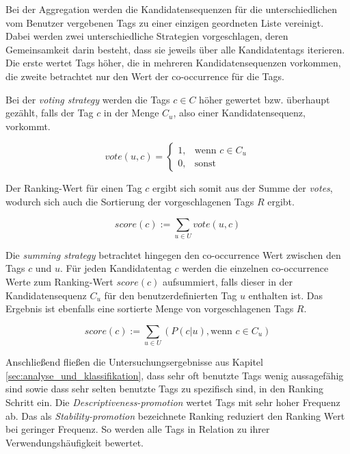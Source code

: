 Bei der Aggregation werden die Kandidatensequenzen für die unterschiedlichen vom Benutzer vergebenen Tags zu einer einzigen geordneten Liste vereinigt. Dabei werden zwei unterschiedliche Strategien vorgeschlagen, deren Gemeinsamkeit darin besteht, dass sie jeweils über alle Kandidatentags iterieren. Die erste wertet Tags höher, die in mehreren Kandidatensequenzen vorkommen, die zweite betrachtet nur den Wert der co-occurrence für die Tags. 

Bei der \emph{voting strategy} werden die Tags $c \in C$ höher gewertet bzw. überhaupt gezählt, falls der Tag $c$ in der Menge $C_u$, also einer Kandidatensequenz, vorkommt. 
\begin{figure}[hptb]
 \begin{equation}
 \label{voteAggregation}
  vote(u, c)=\begin{cases}
    1, & \text{wenn } c \in C_u\\
    0, & \text{sonst }
  \end{cases}
 \end{equation}
\end{figure}

Der Ranking-Wert für einen Tag $c$ ergibt sich somit aus der Summe der \emph{votes}, wodurch sich auch die Sortierung der vorgeschlagenen Tags $R$ ergibt.

\begin{figure}[hptb]
 \begin{equation}
 \label{voteScoreAggregation}
    score(c) := \sum_{u \in U} vote(u, c)
 \end{equation}
\end{figure}


Die \emph{summing strategy} betrachtet hingegen den co-occurrence Wert zwischen den Tags $c$ und $u$. Für jeden Kandidatentag $c$ werden die einzelnen co-occurrence Werte zum Ranking-Wert $score(c)$ aufsummiert, falls dieser in der Kandidatensequenz $C_u$ für den benutzerdefinierten Tag $u$ enthalten ist. Das Ergebnis ist ebenfalls eine sortierte Menge von vorgeschlagenen Tags $R$.
\begin{figure}[hptb]
 \begin{equation}
 \label{sumScoreAggregation}
    score(c) := \sum_{u \in U} (P(c \vert u), \text{wenn } c \in C_u)
 \end{equation}
\end{figure}




Anschließend fließen die Untersuchungsergebnisse aus Kapitel \ref{sec:analyse_und_klassifikation}, dass sehr oft benutzte Tags wenig aussagefähig sind sowie dass sehr selten benutzte Tags zu spezifisch sind, in den Ranking Schritt ein. Die \emph{Descriptiveness-promotion} wertet Tags mit sehr hoher Frequenz ab. Das als \emph{Stability-promotion} bezeichnete Ranking reduziert den Ranking Wert bei geringer Frequenz. So werden alle Tags in Relation zu ihrer Verwendungshäufigkeit bewertet.

